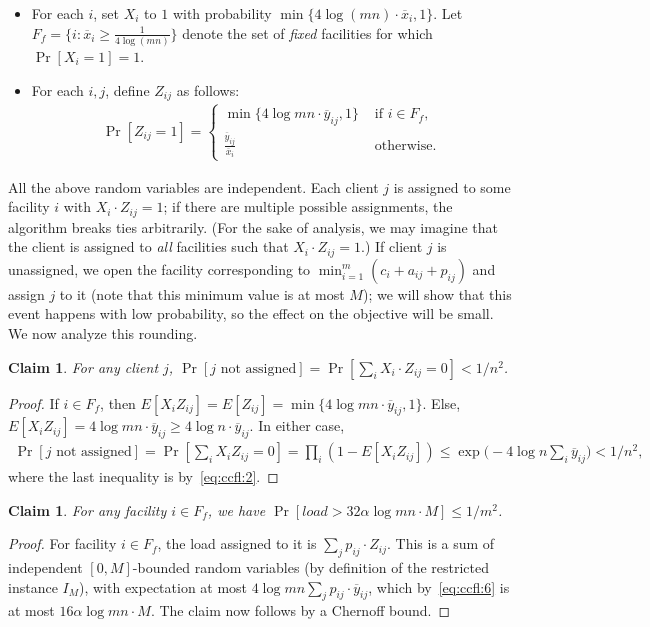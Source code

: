 \documentclass[letterpaper,11pt]{article}
\newtheorem{claim}[thm]{Claim}
\newcommand{\ox}{\ensuremath{\overline{x}}\xspace}
\newcommand{\oy}{\ensuremath{\overline{y}}\xspace}
\def\oy{\overline{y}}
\def\ox{\overline{x}}
\begin{document}
\begin{itemize}
\item For each $i$, set $X_i$ to $1$ with probability $\min\{4\log (mn)
  \cdot \ox_i, 1\}$. Let $F_f =\{i : \ox_{i} \geq \frac{1}{4\log (mn)}\}$
  denote the set of {\em fixed} facilities for which $\Pr[X_i=1]=1$.

\item For each $i,j$, define $Z_{ij}$ as follows:
  \begin{gather*}
    \Pr[ Z_{ij}=1] =
      \begin{cases}
        \min\{4\log mn\cdot \oy_{ij}, 1\} & \mbox{ if }i\in F_f, \\
        \frac{\oy_{ij}}{\ox_i} & \mbox{ otherwise.}
      \end{cases}
  \end{gather*}
\end{itemize}
All the above random variables are independent. Each client $j$ is
assigned to some facility $i$ with $X_i \cdot Z_{ij}=1$; if there are
multiple possible assignments, the algorithm breaks ties arbitrarily.
(For the sake of analysis, we may imagine that the client is assigned to
\emph{all} facilities such that $X_i \cdot Z_{ij}=1$.) If client $j$ is unassigned, we open the facility
corresponding to $\min_{i=1}^m (c_i+a_{ij}+p_{ij})$ and assign $j$ to it (note that this minimum value is at most $M$); we will show that this event happens with low probability, so the effect on the objective will be small.
We now analyze this rounding.

\begin{claim}
  For any client $j$, $\Pr[j\mbox{ not assigned}] = \Pr[ \sum_i X_i\cdot
  Z_{ij}=0] <1/n^2$.
\end{claim}

\begin{proof}
  If $i\in F_f$, then $E[X_i Z_{ij}] =E[Z_{ij}] = \min\{4\log mn\cdot
  \oy_{ij},1\}$. Else, $E[X_i Z_{ij}] = 4\log mn \cdot \oy_{ij} \ge
  4\log n\cdot \oy_{ij}$. In either case,
  \begin{gather*}
    \Pr[j\mbox{ not assigned}] = \Pr[ \sum_i X_i Z_{ij}=0] = \prod_i (1-E[
    X_i Z_{ij}]) \le \exp\bigg(-4\log n\sum_i \oy_{ij}\bigg)<1/n^2,
  \end{gather*}
  where the last inequality is by~\eqref{eq:ccfl:2}.
\end{proof}

\begin{claim}
  For any facility $i\in F_f$, we have $\Pr[load > 32\alpha \log mn\cdot
  M]\le 1/m^2$.
\end{claim}
\begin{proof}
  For facility $i\in F_f$, the load assigned to it is $\sum_j p_{ij}\cdot
  Z_{ij}$. This is a sum of independent $[0,M]$-bounded random variables
  (by definition of the restricted instance $I_M$), with expectation at
  most $4\log mn \sum_j p_{ij}\cdot \oy_{ij}$, which
  by~\eqref{eq:ccfl:6} is at most $16\alpha\log mn\cdot M$. The claim
  now follows by a Chernoff bound.
\end{proof}
\end{document}
